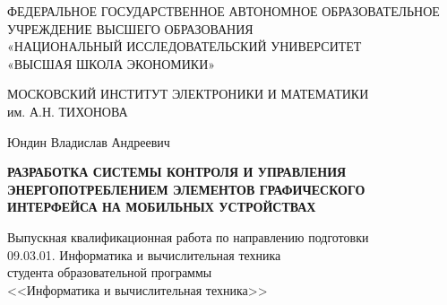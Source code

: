 \documentclass[a4paper,14pt]{extreport} %
\begin{document}
	\thispagestyle{empty}
	\begin{center}
		\small
		ФЕДЕРАЛЬНОЕ ГОСУДАРСТВЕННОЕ АВТОНОМНОЕ ОБРАЗОВАТЕЛЬНОЕ \\ УЧРЕЖДЕНИЕ ВЫСШЕГО ОБРАЗОВАНИЯ \\ 
		«НАЦИОНАЛЬНЫЙ ИССЛЕДОВАТЕЛЬСКИЙ УНИВЕРСИТЕТ \\ 
		«ВЫСШАЯ ШКОЛА ЭКОНОМИКИ» \\
			
		\vspace{5mm}
		
		МОСКОВСКИЙ ИНСТИТУТ ЭЛЕКТРОНИКИ И МАТЕМАТИКИ \\
		им. А.Н. ТИХОНОВА
		
		\normalsize
		\vspace{12mm}
		
		Юндин Владислав Андреевич
		
		\vspace{12mm}
		
		\textbf{РАЗРАБОТКА СИСТЕМЫ КОНТРОЛЯ И УПРАВЛЕНИЯ ЭНЕРГОПОТРЕБЛЕНИЕМ ЭЛЕМЕНТОВ ГРАФИЧЕСКОГО ИНТЕРФЕЙСА НА МОБИЛЬНЫХ УСТРОЙСТВАХ}
		
		\vspace{8mm}
		
		Выпускная квалификационная работа по направлению подготовки \\ 
		09.03.01. Информатика и вычислительная техника \\
		студента образовательной программы \\
		<<Информатика и вычислительная техника>>
	\end{center}

	\vspace{10mm}
\end{document}
